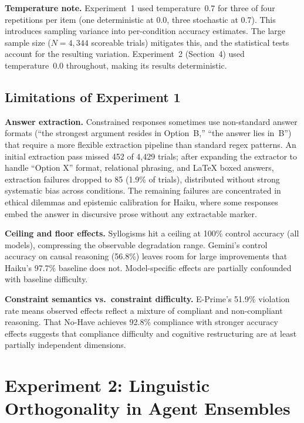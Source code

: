 \documentclass[11pt,a4paper]{article}
\begin{document}
\textbf{Temperature note.} Experiment~1 used temperature~0.7 for three of four repetitions per item (one deterministic at 0.0, three stochastic at 0.7). This introduces sampling variance into per-condition accuracy estimates. The large sample size ($N{=}4{,}344$ scoreable trials) mitigates this, and the statistical tests account for the resulting variation. Experiment~2 (Section~4) used temperature~0.0 throughout, making its results deterministic.

\subsection{Limitations of Experiment 1}
\label{sec:exp1-limitations}

\textbf{Answer extraction.} Constrained responses sometimes use non-standard answer formats (``the strongest argument resides in Option~B,'' ``the answer lies in~B'') that require a more flexible extraction pipeline than standard regex patterns. An initial extraction pass missed 452 of 4,429 trials; after expanding the extractor to handle ``Option X'' format, relational phrasing, and \LaTeX{} boxed answers, extraction failures dropped to 85 (1.9\% of trials), distributed without strong systematic bias across conditions. The remaining failures are concentrated in ethical dilemmas and epistemic calibration for Haiku, where some responses embed the answer in discursive prose without any extractable marker.

\textbf{Ceiling and floor effects.} Syllogisms hit a ceiling at 100\% control accuracy (all models), compressing the observable degradation range. Gemini's control accuracy on causal reasoning (56.8\%) leaves room for large improvements that Haiku's 97.7\% baseline does not. Model-specific effects are partially confounded with baseline difficulty.

\textbf{Constraint semantics vs.\ constraint difficulty.} E-Prime's 51.9\% violation rate means observed effects reflect a mixture of compliant and non-compliant reasoning. That No-Have achieves 92.8\% compliance with stronger accuracy effects suggests that compliance difficulty and cognitive restructuring are at least partially independent dimensions.

\section{Experiment 2: Linguistic Orthogonality in Agent Ensembles}
\end{document}
